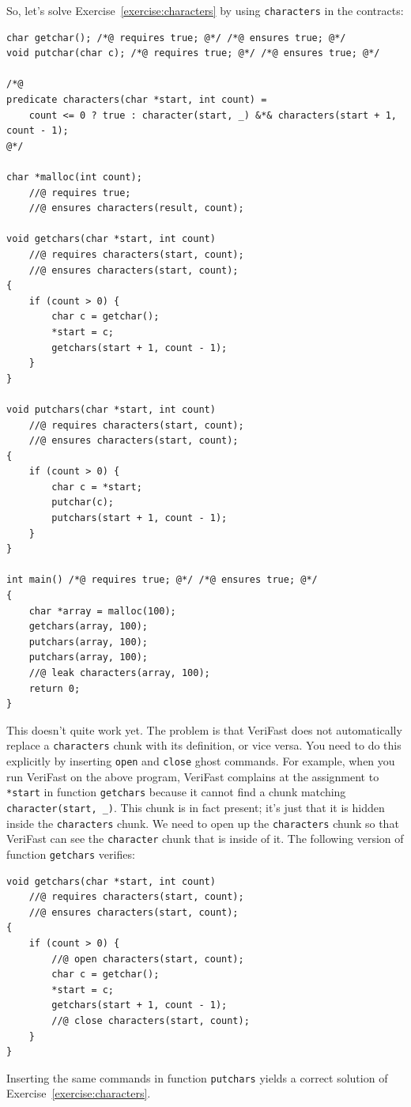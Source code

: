 \documentclass{article}
\begin{document}
So, let's solve Exercise~\ref{exercise:characters} by using \lstinline!characters! in the contracts:
\begin{lstlisting}
char getchar(); /*@ requires true; @*/ /*@ ensures true; @*/
void putchar(char c); /*@ requires true; @*/ /*@ ensures true; @*/

/*@
predicate characters(char *start, int count) =
    count <= 0 ? true : character(start, _) &*& characters(start + 1, count - 1);
@*/

char *malloc(int count);
    //@ requires true;
    //@ ensures characters(result, count);

void getchars(char *start, int count)
    //@ requires characters(start, count);
    //@ ensures characters(start, count);
{
    if (count > 0) {
        char c = getchar();
        *start = c;
        getchars(start + 1, count - 1);
    }
}

void putchars(char *start, int count)
    //@ requires characters(start, count);
    //@ ensures characters(start, count);
{
    if (count > 0) {
        char c = *start;
        putchar(c);
        putchars(start + 1, count - 1);
    }
}

int main() /*@ requires true; @*/ /*@ ensures true; @*/
{
    char *array = malloc(100);
    getchars(array, 100);
    putchars(array, 100);
    putchars(array, 100);
    //@ leak characters(array, 100);
    return 0;
}
\end{lstlisting}
This doesn't quite work yet. The problem is that VeriFast does not automatically replace a \lstinline!characters! chunk with its definition, or vice versa. You need to do this explicitly by inserting
\lstinline!open! and \lstinline!close! ghost commands. For example, when you run VeriFast on the above program, VeriFast complains at the assignment to \lstinline!*start! in function
\lstinline!getchars! because it cannot find a chunk matching \lstinline!character(start, _)!. This chunk is in fact present; it's just that it is hidden inside the \lstinline!characters! chunk. We need to
open up the \lstinline!characters! chunk so that VeriFast can see the \lstinline!character! chunk that is inside of it.
The following version of function \lstinline!getchars! verifies:
\begin{lstlisting}
void getchars(char *start, int count)
    //@ requires characters(start, count);
    //@ ensures characters(start, count);
{
    if (count > 0) {
        //@ open characters(start, count);
        char c = getchar();
        *start = c;
        getchars(start + 1, count - 1);
        //@ close characters(start, count);
    }
}
\end{lstlisting}
Inserting the same commands in function \lstinline!putchars! yields a correct solution of Exercise~\ref{exercise:characters}.
\end{document}
